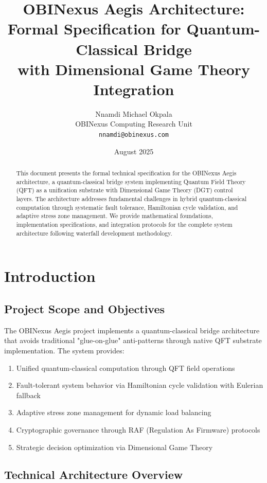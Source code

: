 \documentclass[12pt]{article}
\title{OBINexus Aegis Architecture: \\
Formal Specification for Quantum-Classical Bridge \\
with Dimensional Game Theory Integration}
\author{Nnamdi Michael Okpala \\
OBINexus Computing Research Unit \\
\texttt{nnamdi@obinexus.com}}
\date{August 2025}
\begin{document}
\maketitle

\begin{abstract}
This document presents the formal technical specification for the OBINexus Aegis architecture, a quantum-classical bridge system implementing Quantum Field Theory (QFT) as a unification substrate with Dimensional Game Theory (DGT) control layers. The architecture addresses fundamental challenges in hybrid quantum-classical computation through systematic fault tolerance, Hamiltonian cycle validation, and adaptive stress zone management. We provide mathematical foundations, implementation specifications, and integration protocols for the complete system architecture following waterfall development methodology.
\end{abstract}

\tableofcontents
\newpage

\section{Introduction}

\subsection{Project Scope and Objectives}

The OBINexus Aegis project implements a quantum-classical bridge architecture that avoids traditional "glue-on-glue" anti-patterns through native QFT substrate implementation. The system provides:

\begin{enumerate}
    \item Unified quantum-classical computation through QFT field operations
    \item Fault-tolerant system behavior via Hamiltonian cycle validation with Eulerian fallback
    \item Adaptive stress zone management for dynamic load balancing
    \item Cryptographic governance through RAF (Regulation As Firmware) protocols
    \item Strategic decision optimization via Dimensional Game Theory
\end{enumerate}

\subsection{Technical Architecture Overview}
\end{document}
